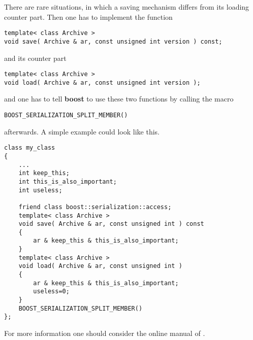 There are rare situations, in which a saving mechanism differs from its loading counter part.
Then one has to implement the function
\begin{lstlisting}
template< class Archive >
void save( Archive & ar, const unsigned int version ) const;
\end{lstlisting}
and its counter part
\begin{lstlisting}
template< class Archive >
void load( Archive & ar, const unsigned int version );
\end{lstlisting}
and one has to tell {\bfseries boost} to use these two functions by calling the macro
\begin{lstlisting}
BOOST_SERIALIZATION_SPLIT_MEMBER()
\end{lstlisting}
afterwards. A simple example could look like this.
\begin{lstlisting}
class my_class
{
    ...
    int keep_this;
    int this_is_also_important;
    int useless;
    
    friend class boost::serialization::access;
    template< class Archive >
    void save( Archive & ar, const unsigned int ) const
    {
        ar & keep_this & this_is_also_important;
    }
    template< class Archive >
    void load( Archive & ar, const unsigned int )
    {
        ar & keep_this & this_is_also_important;
        useless=0;
    }
    BOOST_SERIALIZATION_SPLIT_MEMBER()
};
\end{lstlisting}
For more information one should consider the online manual of \cite{boost}.
